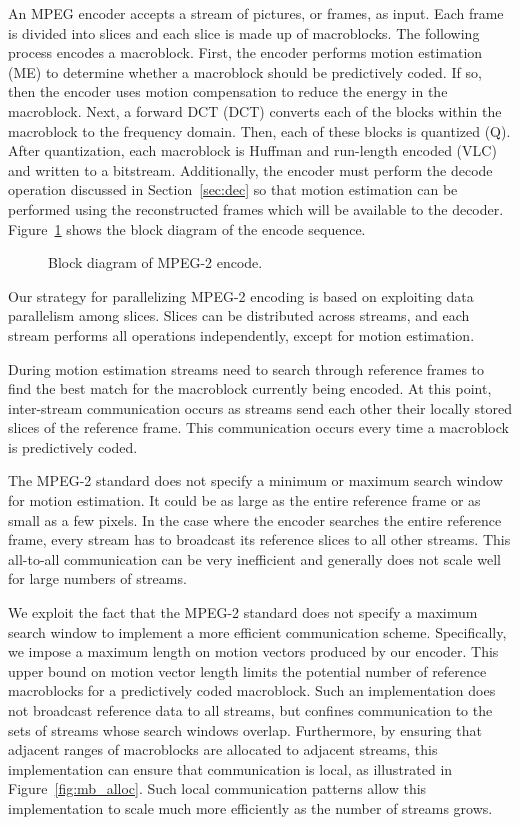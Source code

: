 
An MPEG encoder accepts a stream of pictures, or frames, as input.
Each frame is divided into slices and each slice is made up of
macroblocks.  The following process encodes a macroblock.  First, the
encoder performs motion estimation (ME) to determine whether a
macroblock should be predictively coded.  If so, then the encoder uses
motion compensation to reduce the energy in the macroblock.  Next, a
forward DCT (DCT) converts each of the blocks within the macroblock to
the frequency domain.  Then, each of these blocks is quantized (Q).
After quantization, each macroblock is Huffman and run-length encoded
(VLC) and written to a bitstream.  Additionally, the encoder must
perform the decode operation discussed in Section~\ref{sec:dec} so
that motion estimation can be performed using the reconstructed frames
which will be available to the decoder.  Figure~\ref{fig:ec_block}
shows the block diagram of the encode sequence.

\begin{figure}[htbp]
\centerline{ }
\caption{Block diagram of MPEG-2 encode.}
\label{fig:ec_block}
\end{figure}

Our strategy for parallelizing MPEG-2 encoding is based on exploiting
data parallelism among slices.  Slices can be distributed across
streams, and each stream performs all operations independently, except
for motion estimation.

During motion estimation streams need to search through reference
frames to find the best match for the macroblock currently being
encoded.  At this point, inter-stream communication occurs as streams
send each other their locally stored slices of the reference frame.
This communication occurs every time a macroblock is predictively
coded.

The MPEG-2 standard does not specify a minimum or maximum search
window for motion estimation.  It could be as large as the entire
reference frame or as small as a few pixels.  In the case where the
encoder searches the entire reference frame, every stream has to
broadcast its reference slices to all other streams.  This all-to-all
communication can be very inefficient and generally does not scale
well for large numbers of streams.

We exploit the fact that the MPEG-2 standard does not specify a
maximum search window to implement a more efficient communication
scheme. Specifically, we impose a maximum length on motion vectors
produced by our encoder.  This upper bound on motion vector length
limits the potential number of reference macroblocks for a
predictively coded macroblock.  Such an implementation does not
broadcast reference data to all streams, but confines communication to
the sets of streams whose search windows overlap.  Furthermore, by
ensuring that adjacent ranges of macroblocks are allocated to adjacent
streams, this implementation can ensure that communication is local,
as illustrated in Figure~\ref{fig:mb_alloc}.  Such local communication
patterns allow this implementation to scale much more efficiently as
the number of streams grows.

